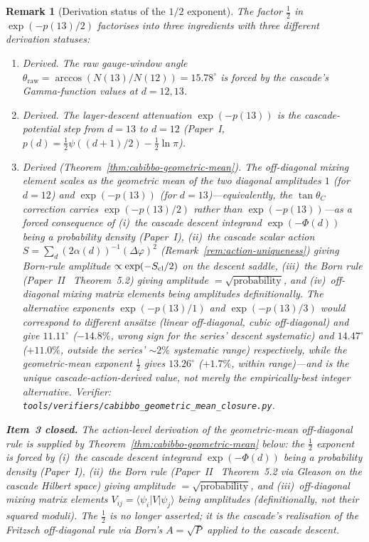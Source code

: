 \documentclass[12pt,a4paper]{article}
\newtheorem*{remark}{Remark}
\begin{document}
\begin{remark}[Derivation status of the $1/2$ exponent]\label{rem:sp35-status}
The factor $\tfrac{1}{2}$ in $\exp(-p(13)/2)$ factorises into three
ingredients with three different derivation statuses:
\begin{enumerate}
\item \emph{Derived.} The raw gauge-window angle
$\theta_{\mathrm{raw}} = \arccos(N(13)/N(12)) = 15.78^\circ$ is forced
by the cascade's Gamma-function values at $d=12,13$.
\item \emph{Derived.} The layer-descent attenuation $\exp(-p(13))$ is
the cascade-potential step from $d=13$ to $d=12$ (Paper~I,
$p(d) = \tfrac{1}{2}\psi((d+1)/2) - \tfrac{1}{2}\ln\pi$).
\item \emph{Derived} (Theorem~\ref{thm:cabibbo-geometric-mean}). The
off-diagonal mixing element scales as the \emph{geometric mean} of
the two diagonal amplitudes $1$ (for $d{=}12$) and $\exp(-p(13))$
(for $d{=}13$)---equivalently, the $\tan\theta_C$ correction
carries $\exp(-p(13)/2)$ rather than $\exp(-p(13))$---as a forced
consequence of (i)~the cascade descent integrand $\exp(-\Phi(d))$
being a probability density (Paper~I), (ii)~the cascade scalar
action $S=\sum_d(2\alpha(d))^{-1}(\Delta\varphi)^2$
(Remark~\ref{rem:action-uniqueness}) giving Born-rule amplitude
$\propto\exp(-S_{\rm cl}/2)$ on the descent saddle, (iii)~the Born
rule (Paper~II~\cite{part2} Theorem~5.2) giving
amplitude $=\sqrt{\text{probability}}$, and (iv)~off-diagonal
mixing matrix elements being amplitudes definitionally. The
alternative exponents $\exp(-p(13)/1)$ and $\exp(-p(13)/3)$ would
correspond to different ans\"atze (linear off-diagonal, cubic
off-diagonal) and give $11.11^\circ$ ($-14.8\%$, wrong sign for
the series' descent systematic) and $14.47^\circ$ ($+11.0\%$,
outside the series' $\sim 2\%$ systematic range) respectively,
while the geometric-mean exponent $\tfrac{1}{2}$ gives
$13.26^\circ$ ($+1.7\%$, within range)---and is the
\emph{unique} cascade-action-derived value, not merely the
empirically-best integer alternative. Verifier:
\texttt{tools/verifiers/cabibbo\_geometric\_mean\_closure.py}.
\end{enumerate}

\medskip\noindent\textbf{Item~3 closed.} The action-level derivation
of the geometric-mean off-diagonal rule is supplied
by Theorem~\ref{thm:cabibbo-geometric-mean} below: the $\tfrac{1}{2}$
exponent is forced by (i)~the cascade descent integrand
$\exp(-\Phi(d))$ being a probability density (Paper~I), (ii)~the Born
rule (Paper~II~\cite{part2} Theorem~5.2 via Gleason on
the cascade Hilbert space) giving amplitude $=\sqrt{\text{probability}}$,
and (iii)~off-diagonal mixing matrix elements $V_{ij} = \langle\psi_i|V|\psi_j\rangle$
being amplitudes (definitionally, not their squared moduli).  The
$\tfrac{1}{2}$ is no longer asserted; it is the cascade's realisation
of the Fritzsch off-diagonal rule via Born's $A=\sqrt{P}$ applied to
the cascade descent.
\end{remark}
\end{document}
